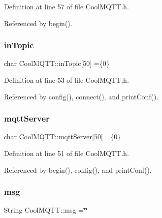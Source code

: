 Definition at line 57 of file Cool\+M\+Q\+T\+T.\+h.



Referenced by begin().

\mbox{\label{classCoolMQTT_a4492f52a441e83cc5151010317fdb52d}} 
\subsubsection{\texorpdfstring{in\+Topic}{inTopic}}
{\footnotesize\ttfamily char Cool\+M\+Q\+T\+T\+::in\+Topic\mbox{[}50\mbox{]} =\{\textquotesingle{}0\textquotesingle{}\}\hspace{0.3cm}{\ttfamily [private]}}



Definition at line 53 of file Cool\+M\+Q\+T\+T.\+h.



Referenced by config(), connect(), and print\+Conf().

\mbox{\label{classCoolMQTT_ab8bb951f87ddbf92db74c2ad16a3e53e}} 
\subsubsection{\texorpdfstring{mqtt\+Server}{mqttServer}}
{\footnotesize\ttfamily char Cool\+M\+Q\+T\+T\+::mqtt\+Server\mbox{[}50\mbox{]} =\{\textquotesingle{}0\textquotesingle{}\}\hspace{0.3cm}{\ttfamily [private]}}



Definition at line 51 of file Cool\+M\+Q\+T\+T.\+h.



Referenced by begin(), config(), and print\+Conf().

\mbox{\label{classCoolMQTT_af6b19e7074dbbb4ae493c44dcb53f7ff}} 
\subsubsection{\texorpdfstring{msg}{msg}}
{\footnotesize\ttfamily String Cool\+M\+Q\+T\+T\+::msg =\char`\"{}\char`\"{}\hspace{0.3cm}{\ttfamily [private]}}



